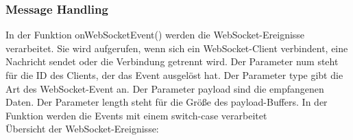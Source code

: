 \documentclass[ngerman,12pt,a4paper]{article}
\begin{document}
			\subsubsection{Message Handling}
			
	In der Funktion onWebSocketEvent() werden die WebSocket-Ereignisse verarbeitet. Sie wird aufgerufen, wenn sich ein WebSocket-Client verbindent, eine Nachricht sendet oder die Verbindung getrennt wird.
	Der Parameter num steht für die ID des Clients, der das Event ausgelöst hat. Der Parameter type gibt die Art des WebSocket-Event an. Der Parameter payload sind die empfangenen Daten. Der Parameter length steht für die Größe des payload-Buffers. 
	In der Funktion werden die Events mit einem switch-case verarbeitet\\[5cm]
	Übersicht der WebSocket-Ereignisse:
	
\end{document}
